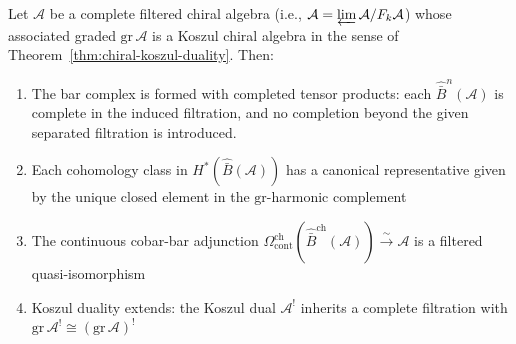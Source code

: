 \begin{theorem}
\label{thm:convergence-filtered}
Let $\mathcal{A}$ be a complete filtered chiral algebra (i.e.,
$\mathcal{A} = \varprojlim \mathcal{A}/F_k\mathcal{A}$) whose associated
graded $\mathrm{gr}\,\mathcal{A}$ is a Koszul chiral algebra in the sense of
Theorem~\ref{thm:chiral-koszul-duality}. Then:
\begin{enumerate}
\item The bar complex is formed with completed tensor products:
each $\widehat{\bar{B}}^n(\mathcal{A})$ is complete in the induced
filtration, and no completion beyond the given separated filtration is
introduced.
\item Each cohomology class in $H^*(\widehat{\bar{B}}(\mathcal{A}))$ has a canonical
representative given by the unique closed element in the $\mathrm{gr}$-harmonic
complement
\item The continuous cobar-bar adjunction
$\Omega^{\mathrm{ch}}_{\mathrm{cont}}(\widehat{\bar{B}}^{\mathrm{ch}}(\mathcal{A})) \xrightarrow{\sim}
\mathcal{A}$ is a filtered quasi-isomorphism
\item Koszul duality extends: the Koszul dual $\mathcal{A}^!$ inherits a
complete filtration with $\mathrm{gr}\,\mathcal{A}^! \cong
(\mathrm{gr}\,\mathcal{A})^!$
\end{enumerate}
\end{theorem}

